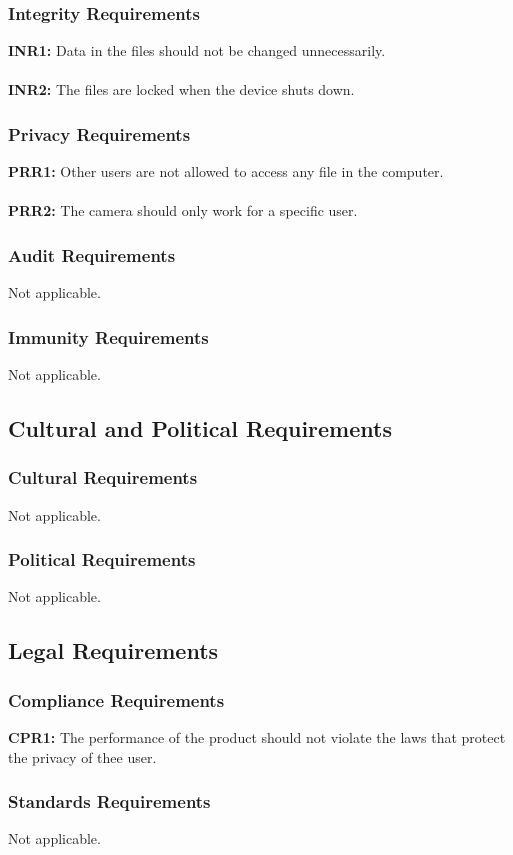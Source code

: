 \documentclass[12pt]{article}
\begin{document}
\subsubsection{Integrity Requirements}
\textbf{INR1:} Data in the files should not be changed unnecessarily.\\\\
\textbf{INR2:} The files are locked when the device shuts down.
\subsubsection{Privacy Requirements}
\textbf{PRR1:} Other users are not allowed to access any file in the computer.\\\\
\textbf{PRR2:} The camera should only work for a specific user.
\subsubsection{Audit Requirements}
Not applicable.
\subsubsection{Immunity Requirements}
Not applicable.
\subsection{Cultural and Political Requirements}
\subsubsection{Cultural Requirements}
Not applicable.
\subsubsection{Political Requirements}
Not applicable.
\subsection{Legal Requirements}
\subsubsection{Compliance Requirements}
\textbf{CPR1:} The performance of the product should not violate the laws that protect the privacy of thee user.
\subsubsection{Standards Requirements}
Not applicable.
\end{document}
